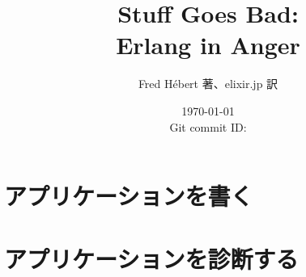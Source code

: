 \documentclass[autodetect-engine, dvipdfmx-if-dvi, base=11pt, oneside, ja=standard]{bxjsreport}
\title{Stuff Goes Bad:\protect\\ Erlang in Anger}
\author{Fred Hébert 著、elixir.jp 訳}
\date{%
  \today \\
  Git commit ID: \href{https://github.com/ymotongpoo/erlang-in-anger}{\GITAbrHash}
}
\begin{document}
\frontmatter

\maketitle





\clearpage

\tableofcontents

\listoffigures

\hypersetup{linkcolor=violet}



\mainmatter

\part{アプリケーションを書く}
\label{part:writing-applications}





\part{アプリケーションを診断する}
\label{part:diagnosing-applictions}
















\end{document}
